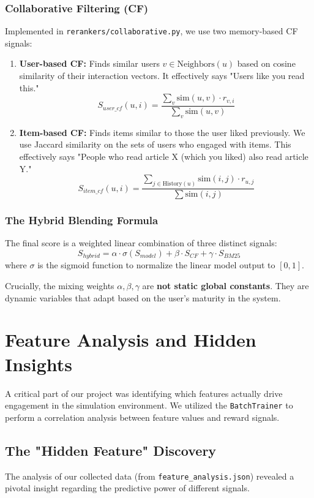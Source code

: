 \documentclass[11pt,a4paper]{article}
\begin{document}
\subsubsection{Collaborative Filtering (CF)}
Implemented in \texttt{rerankers/collaborative.py}, we use two memory-based CF signals:
\begin{enumerate}
    \item \textbf{User-based CF:} Finds similar users $v \in \text{Neighbors}(u)$ based on cosine similarity of their interaction vectors. It effectively says "Users like you read this."
    $$ S_{user\_cf}(u, i) = \frac{\sum_{v} \text{sim}(u, v) \cdot r_{v,i}}{\sum_{v} \text{sim}(u, v)} $$
    \item \textbf{Item-based CF:} Finds items similar to those the user liked previously. We use Jaccard similarity on the sets of users who engaged with items. This effectively says "People who read article X (which you liked) also read article Y."
    $$ S_{item\_cf}(u, i) = \frac{\sum_{j \in \text{History}(u)} \text{sim}(i, j) \cdot r_{u,j}}{\sum \text{sim}(i, j)} $$
\end{enumerate}

\subsubsection{The Hybrid Blending Formula}
The final score is a weighted linear combination of three distinct signals:
\begin{equation}
S_{hybrid} = \alpha \cdot \sigma(S_{model}) + \beta \cdot S_{CF} + \gamma \cdot S_{BM25}
\end{equation}
where $\sigma$ is the sigmoid function to normalize the linear model output to $[0,1]$.

Crucially, the mixing weights $\alpha, \beta, \gamma$ are \textbf{not static global constants}. They are dynamic variables that adapt based on the user's maturity in the system.

\section{Feature Analysis and Hidden Insights}

A critical part of our project was identifying which features actually drive engagement in the simulation environment. We utilized the \texttt{BatchTrainer} to perform a correlation analysis between feature values and reward signals.

\subsection{The "Hidden Feature" Discovery}
The analysis of our collected data (from \texttt{feature\_analysis.json}) revealed a pivotal insight regarding the predictive power of different signals.
\end{document}
